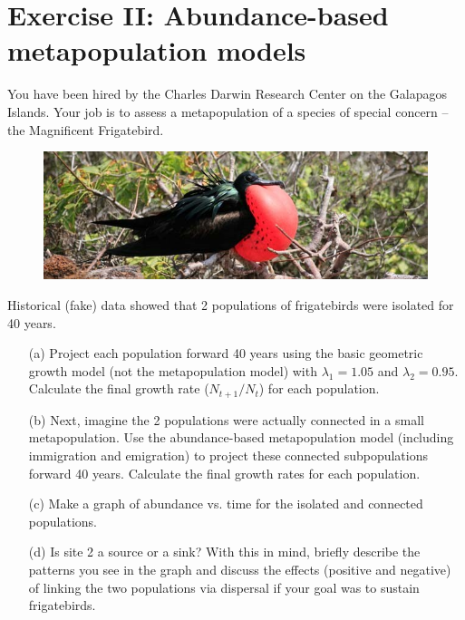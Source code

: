 \documentclass[12pt]{article}\usepackage[]{graphicx}\usepackage[]{xcolor}
\begin{document}
\clearpage


\section*{Exercise II: Abundance-based metapopulation models }
You have been hired by the Charles Darwin Research Center on the
Galapagos Islands. Your job is to assess a metapopulation of a species
of special concern -- the Magnificent Frigatebird.

\begin{figure}[h!]
  \centering
  \includegraphics[width=\textwidth]{figs/frigatebird}
  \label{fig:frig}
\end{figure}

\vspace{-24pt}

Historical (fake) data showed that 2 populations of frigatebirds were
isolated for 40 years.

\begin{enumerate}
  \item[(a)] Project each population forward 40 years using the basic
    geometric growth model (not the metapopulation model) with
    $\lambda_1=1.05$ and $\lambda_2=0.95$. Calculate the final growth
    rate ($N_{t+1}/N_t$) for each population.
  \item[(b)] Next, imagine the 2 populations were actually connected
    in a small metapopulation. Use the abundance-based metapopulation
    model (including immigration and emigration) to project these
    connected subpopulations forward 40 years. Calculate the final
    growth rates for each population.
  \item[(c)] Make a graph of abundance vs. time for the isolated and
    connected populations.
  \item[(d)] Is site 2 a source or a sink? With this in mind,
    briefly describe the patterns you see in the graph and discuss the
    effects (positive and negative) of linking the two populations via
    dispersal if your goal was to sustain frigatebirds.
\end{enumerate}
\end{document}
